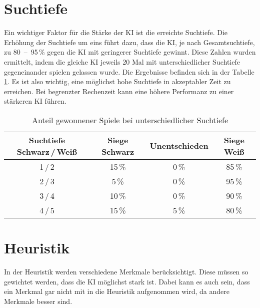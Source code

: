 
\section{Suchtiefe}
Ein wichtiger Faktor für die Stärke der KI ist die erreichte Suchtiefe.
Die Erhöhung der Suchtiefe um eins führt dazu, dass die KI, je nach Gesamtsuchtiefe, zu 80~–~95\,\% gegen die KI mit geringerer Suchtiefe gewinnt.
Diese Zahlen wurden ermittelt, indem die gleiche KI jeweils 20 Mal mit unterschiedlicher Suchtiefe gegeneinander spielen gelassen wurde.
Die Ergebnisse befinden sich in der Tabelle \ref{table:search-depth}.
Es ist also wichtig, eine möglichst hohe Suchtiefe in akzeptabler Zeit zu erreichen.
Bei begrenzter Rechenzeit kann eine höhere Performanz zu einer stärkeren KI führen.

\begin{table}[hb]
    \centering
    \begin{tabular}{c|ccc}
    \hline
    Suchtiefe Schwarz\,/\,Weiß & Siege Schwarz & Unentschieden & Siege Weiß \\ \hline
    1\,/\,2  & 15\,\% &  0\,\% & 85\,\% \\
    2\,/\,3  &  5\,\% &  0\,\% & 95\,\% \\
    3\,/\,4  & 10\,\% &  0\,\% & 90\,\% \\
    4\,/\,5  & 15\,\% &  5\,\% & 80\,\% \\
    \hline
    \end{tabular}
    \caption{Anteil gewonnener Spiele bei unterschiedlicher Suchtiefe}
    \label{table:search-depth}
\end{table}

\section{Heuristik}
In der Heuristik werden verschiedene Merkmale berücksichtigt. Diese müssen so gewichtet werden, dass die KI möglichst
stark ist. Dabei kann es auch sein, dass ein Merkmal gar nicht mit in die Heuristik aufgenommen wird, da andere Merkmale
besser sind.

